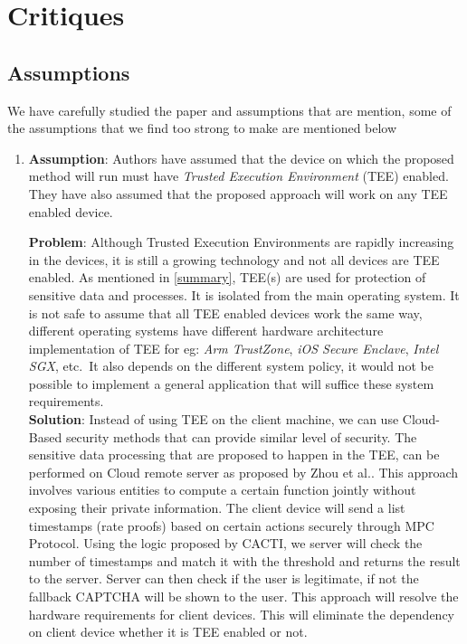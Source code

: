\section{Critiques}

\subsection{Assumptions}

We have carefully studied the paper and assumptions that are mention, some of the assumptions that we find too strong to make are mentioned below

\begin{enumerate}
	\item \textbf{Assumption}: Authors have assumed that the device on which the proposed method will run must have \textit{Trusted Execution Environment} (TEE) enabled. They have also assumed that the proposed approach will work on any TEE enabled device.

	\textbf{Problem}: Although Trusted Execution Environments are rapidly increasing in the devices, it is still a growing technology and not all devices are TEE enabled. As mentioned in \ref{summary}, TEE(s) are used for protection of sensitive data and processes. It is isolated from the main operating system. It is not safe to assume that all TEE enabled devices work the same way, different operating systems have different hardware architecture implementation of TEE for eg: \textit{Arm TrustZone}, \textit{iOS Secure Enclave}, \textit{Intel SGX}, etc.\ It also depends on the different system policy, it would not be possible to implement a general application that will suffice these system requirements.\\

	\textbf{Solution}: Instead of using TEE on the client machine, we can use Cloud-Based security methods that can provide similar level of security. The sensitive data processing that are proposed to happen in the TEE, can be performed on Cloud remote server as proposed by Zhou et al.\cite{ref1}. This approach involves various entities to compute a certain function jointly without exposing their private information. The client device will send a list timestamps (rate proofs) based on certain actions securely through MPC Protocol. Using the logic proposed by CACTI, we server will check the number of timestamps and match it with the threshold and returns the result to the server. Server can then check if the user is legitimate, if not the fallback CAPTCHA will be shown to the user. This approach will resolve the hardware requirements for client devices. This will eliminate the dependency on client device whether it is TEE enabled or not.\\


\end{enumerate}
